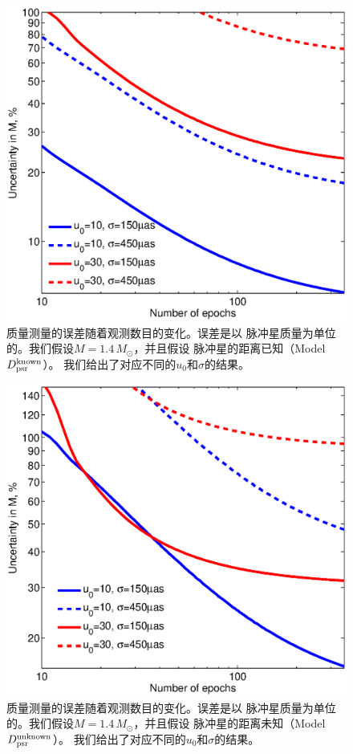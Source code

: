 %
\begin{figure}
\begin{center}
  \includegraphics[width=4 in,trim=0 0 0 3.2cm]{mass_6.eps}
%
\caption{质量测量的误差随着观测数目的变化。误差是以
脉冲星质量为单位的。我们假设$M=1.4$\,$M_{\odot}$，并且假设
脉冲星的距离已知（Model $D_{\rm{psr}}^{\rm{known}}$）。
我们给出了对应不同的$u_0$和$\sigma$的结果。
}
\label{mass_6}
\end{center}
\end{figure}
%
%
\begin{figure}
\begin{center}
  \includegraphics[width=4 in,trim=0 0 0 3.2cm]{mass_7.eps}
%
\caption{质量测量的误差随着观测数目的变化。误差是以
脉冲星质量为单位的。我们假设$M=1.4$\,$M_{\odot}$，并且假设
脉冲星的距离未知（Model $D_{\rm{psr}}^{\rm{unknown}}$）。
我们给出了对应不同的$u_0$和$\sigma$的结果。
}
\label{mass_7}
\end{center}
\end{figure}
%

